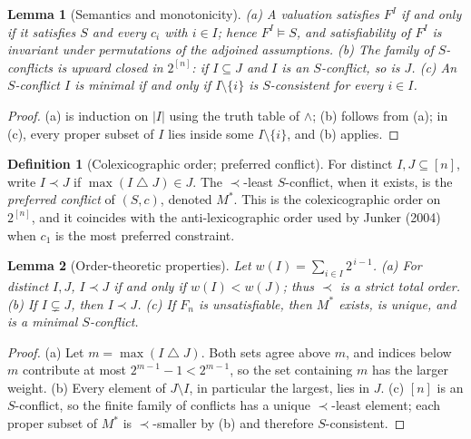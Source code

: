 \documentclass[11pt,reqno]{amsart}
\theoremstyle{plain}
\newtheorem{lemma}{Lemma}
\theoremstyle{definition}
\newtheorem{definition}{Definition}
\newcommand{\Mstar}{M^{*}}
\newcommand{\sd}{\mathbin{\triangle}}        %
\begin{document}
\begin{lemma}[Semantics and monotonicity]
\textup{(a)} A valuation satisfies $F^I$ if and only if it satisfies $S$ and every
$c_i$ with $i\in I$; hence $F^I\vDash S$, and satisfiability of $F^I$ is invariant
under permutations of the adjoined assumptions.
\textup{(b)} The family of $S$-conflicts is upward closed in $2^{[n]}$: if
$I\subseteq J$ and $I$ is an $S$-conflict, so is $J$.
\textup{(c)} An $S$-conflict $I$ is minimal if and only if $I\setminus\{i\}$ is
$S$-consistent for every $i\in I$.
\end{lemma}
\begin{proof}
(a) is induction on $|I|$ using the truth table of $\wedge$; (b) follows from (a);
in (c), every proper subset of $I$ lies inside some $I\setminus\{i\}$, and (b)
applies.
\end{proof}

\begin{definition}[Colexicographic order; preferred conflict]
For distinct $I,J\subseteq[n]$, write $I\prec J$ if $\max(I\sd J)\in J$. The
$\prec$-least $S$-conflict, when it exists, is the \emph{preferred conflict} of
$(S,c)$, denoted $\Mstar$. This is the colexicographic order on $2^{[n]}$, and it
coincides with the anti-lexicographic order used by Junker (2004) when $c_1$ is the
most preferred constraint.
\end{definition}

\begin{lemma}[Order-theoretic properties]
Let $w(I)=\sum_{i\in I}2^{\,i-1}$.
\textup{(a)} For distinct $I,J$, $I\prec J$ if and only if $w(I)<w(J)$; thus
$\prec$ is a strict total order.
\textup{(b)} If $I\subsetneq J$, then $I\prec J$.
\textup{(c)} If $F_n$ is unsatisfiable, then $\Mstar$ exists, is unique, and is a
minimal $S$-conflict.
\end{lemma}
\begin{proof}
(a) Let $m=\max(I\sd J)$. Both sets agree above $m$, and indices below $m$
contribute at most $2^{m-1}-1<2^{m-1}$, so the set containing $m$ has the larger
weight. (b) Every element of $J\setminus I$, in particular the largest, lies in
$J$. (c) $[n]$ is an $S$-conflict, so the finite family of conflicts has a unique
$\prec$-least element; each proper subset of $\Mstar$ is $\prec$-smaller by (b) and
therefore $S$-consistent.
\end{proof}
\end{document}
